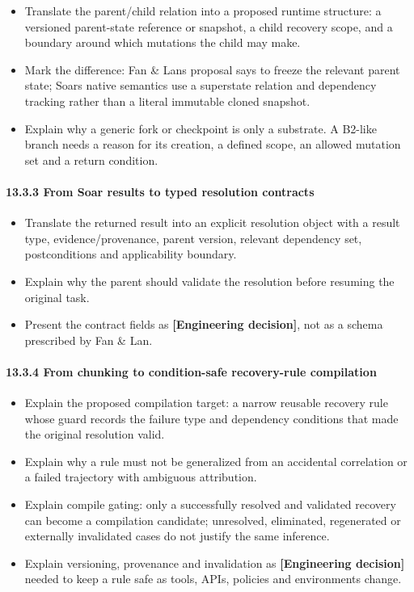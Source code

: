\begin{itemize}
\tightlist
\item
  Translate the parent/child relation into a proposed runtime structure: a versioned parent-state reference or snapshot, a child recovery scope, and a boundary around which mutations the child may make.
\item
  Mark the difference: Fan \& Lan\textquotesingle s proposal says to freeze the relevant parent state; Soar\textquotesingle s native semantics use a superstate relation and dependency tracking rather than a literal immutable cloned snapshot.
\item
  Explain why a generic fork or checkpoint is only a substrate. A B2-like branch needs a reason for its creation, a defined scope, an allowed mutation set and a return condition.
\end{itemize}

\paragraph{13.3.3 From Soar results to typed resolution contracts}\label{1333-from-soar-results-to-typed-resolution-contracts}

\begin{itemize}
\tightlist
\item
  Translate the returned result into an explicit resolution object with a result type, evidence/provenance, parent version, relevant dependency set, postconditions and applicability boundary.
\item
  Explain why the parent should validate the resolution before resuming the original task.
\item
  Present the contract fields as \textbf{{[}Engineering decision{]}}, not as a schema prescribed by Fan \& Lan.
\end{itemize}

\paragraph{13.3.4 From chunking to condition-safe recovery-rule compilation}\label{1334-from-chunking-to-condition-safe-recovery-rule-compilation}

\begin{itemize}
\tightlist
\item
  Explain the proposed compilation target: a narrow reusable recovery rule whose guard records the failure type and dependency conditions that made the original resolution valid.
\item
  Explain why a rule must not be generalized from an accidental correlation or a failed trajectory with ambiguous attribution.
\item
  Explain compile gating: only a successfully resolved and validated recovery can become a compilation candidate; unresolved, eliminated, regenerated or externally invalidated cases do not justify the same inference.
\item
  Explain versioning, provenance and invalidation as \textbf{{[}Engineering decision{]}} needed to keep a rule safe as tools, APIs, policies and environments change.
\end{itemize}

